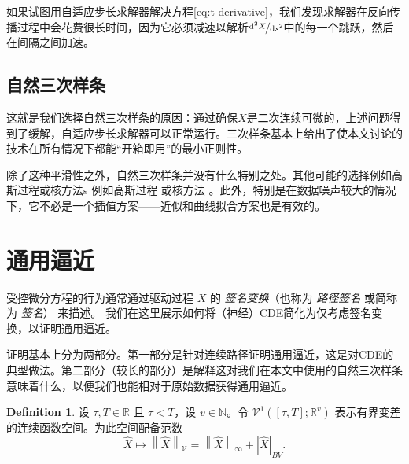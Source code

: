 \documentclass{ctexart}
\theoremstyle{plain}
\theoremstyle{definition}
\newtheorem{definition}[thm]{Definition}
\newcommand{\norm}[1]{\left\|#1\right\|}
\newcommand{\abs}[1]{\left|#1\right|}
\newcommand{\reals}{\mathbb{R}}
\newcommand{\naturals}{\mathbb{N}}
\newcommand{\ttfrac}[2]{\nicefrac{#1}{#2}}
\begin{document}
 如果试图用自适应步长求解器解决方程\eqref{eq:t-derivative}，我们发现求解器在反向传播过程中会花费很长时间，因为它必须减速以解析$\ttfrac{\mathrm{d}^2 X}{\mathrm{d} s^2}$中的每一个跳跃，然后在间隔之间加速。
	
	\subsection{自然三次样条}
	这就是我们选择自然三次样条的原因：通过确保$X$是二次连续可微的，上述问题得到了缓解，自适应步长求解器可以正常运行。三次样条基本上给出了使本文讨论的技术在所有情况下都能“开箱即用”的最小正则性。
	
 除了这种平滑性之外，自然三次样条并没有什么特别之处。其他可能的选择例如高斯过程\cite{gp-adapter1, gp-adapter2}或核方法\cite{interpolation-prediction}s 例如高斯过程 \cite{gp-adapter1, gp-adapter2} 或核方法 \cite{interpolation-prediction}。此外，特别是在数据噪声较大的情况下，它不必是一个插值方案——近似和曲线拟合方案也是有效的。

\section{通用逼近}\label{appendix:universal}
受控微分方程的行为通常通过驱动过程 $X$ 的 \emph{签名变换}（也称为 \emph{路径签名} 或简称为 \emph{签名}）\cite{levy-lyons} 来描述。%
我们在这里展示如何将（神经）CDE简化为仅考虑签名变换，以证明通用逼近。

证明基本上分为两部分。第一部分是针对连续路径证明通用逼近，这是对CDE的典型做法。第二部分（较长的部分）是解释这对我们在本文中使用的自然三次样条意味着什么，以便我们也能相对于原始数据获得通用逼近。
\begin{definition}
设 $\tau, T \in \reals$ 且 $\tau < T$，设 $v \in \naturals$。令 $\mathcal{V}^1([\tau, T]; \reals^v)$ 表示有界变差的连续函数空间。为此空间配备范数
\begin{equation*}
	\widehat{X} \mapsto \norm{\widehat{X}}_{\mathcal{V}} = \norm{\widehat{X}}_{\infty} + \abs{\widehat{X}}_{BV}.
\end{equation*}
\end{definition}
\end{document}
